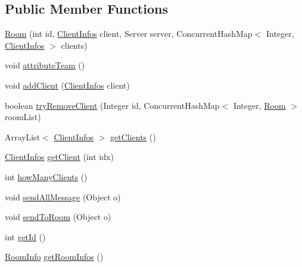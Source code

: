 \subsection*{Public Member Functions}
\begin{DoxyCompactItemize}
\item 
\mbox{\hyperlink{classServer_1_1ServerConnexion_1_1Room_a191c2d5940dc3c6cb1fece18e879a64d}{Room}} (int id, \mbox{\hyperlink{classServer_1_1ServerConnexion_1_1ClientInfos}{Client\+Infos}} client, Server server, Concurrent\+Hash\+Map$<$ Integer, \mbox{\hyperlink{classServer_1_1ServerConnexion_1_1ClientInfos}{Client\+Infos}} $>$ clients)
\item 
void \mbox{\hyperlink{classServer_1_1ServerConnexion_1_1Room_a1c5bc1300ad6c1be3019e20fc44bce79}{attribute\+Team}} ()
\item 
void \mbox{\hyperlink{classServer_1_1ServerConnexion_1_1Room_afc78e8884ccced8e6ccddcdf9c3b0d81}{add\+Client}} (\mbox{\hyperlink{classServer_1_1ServerConnexion_1_1ClientInfos}{Client\+Infos}} client)
\item 
boolean \mbox{\hyperlink{classServer_1_1ServerConnexion_1_1Room_a5b478e86f07cb7f40db27f8db26fb955}{try\+Remove\+Client}} (Integer id, Concurrent\+Hash\+Map$<$ Integer, \mbox{\hyperlink{classServer_1_1ServerConnexion_1_1Room}{Room}} $>$ room\+List)
\item 
Array\+List$<$ \mbox{\hyperlink{classServer_1_1ServerConnexion_1_1ClientInfos}{Client\+Infos}} $>$ \mbox{\hyperlink{classServer_1_1ServerConnexion_1_1Room_aa8d4955026b246208bfda5e6a1199e86}{get\+Clients}} ()
\item 
\mbox{\hyperlink{classServer_1_1ServerConnexion_1_1ClientInfos}{Client\+Infos}} \mbox{\hyperlink{classServer_1_1ServerConnexion_1_1Room_a22d44a6dcc0a72fb36c1be8d355c1f53}{get\+Client}} (int idx)
\item 
int \mbox{\hyperlink{classServer_1_1ServerConnexion_1_1Room_a952b0f724c1f5e04a78a70dfed594c20}{how\+Many\+Clients}} ()
\item 
void \mbox{\hyperlink{classServer_1_1ServerConnexion_1_1Room_a53c24cabf3f30a8aff5e4a563d5f08d7}{send\+All\+Message}} (Object o)
\item 
void \mbox{\hyperlink{classServer_1_1ServerConnexion_1_1Room_a7cd935fd7d302c107bb42d8c7faf5d75}{send\+To\+Room}} (Object o)
\item 
int \mbox{\hyperlink{classServer_1_1ServerConnexion_1_1Room_a14346f0160466c67d28dbf45926225b2}{get\+Id}} ()
\item 
\mbox{\hyperlink{classCommon_1_1RoomInfo}{Room\+Info}} \mbox{\hyperlink{classServer_1_1ServerConnexion_1_1Room_a770cf7370fbcf6cef279f4ea260159fe}{get\+Room\+Infos}} ()

\end{DoxyCompactItemize}
